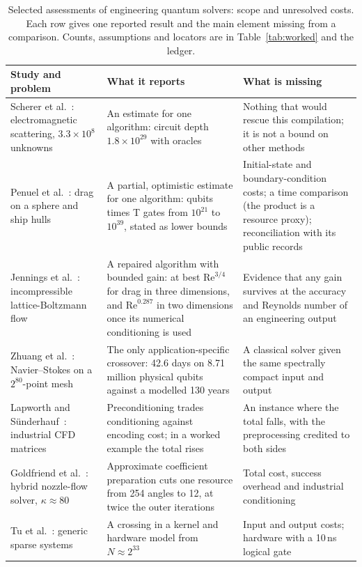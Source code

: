 \documentclass[10pt,a4paper]{article}
\begin{document}
\begin{table}[htbp]
\centering\small
\caption{Selected assessments of engineering quantum solvers: scope and unresolved costs. Each row gives one reported result and the main element missing from a comparison. Counts, assumptions and locators are in Table~\ref{tab:worked} and the ledger.}\label{tab:linstudies}
\begin{tabular}{@{}L{3.4cm} L{6.6cm} L{5.8cm}@{}}
\toprule
Study and problem & What it reports & What is missing\\\midrule
Scherer et al.~\cite{scherer2017}: electromagnetic scattering, $3.3\times10^8$ unknowns & An estimate for one algorithm: circuit depth $1.8\times10^{29}$ with oracles & Nothing that would rescue this compilation; it is not a bound on other methods\\
Penuel et al.~\cite{penuel2025}: drag on a sphere and ship hulls & A partial, optimistic estimate for one algorithm: qubits times T gates from $10^{21}$ to $10^{39}$, stated as lower bounds & Initial-state and boundary-condition costs; a time comparison (the product is a resource proxy); reconciliation with its public records\\
Jennings et al.~\cite{jennings2025}: incompressible lattice-Boltzmann flow & A repaired algorithm with bounded gain: at best $\mathrm{Re}^{3/4}$ for drag in three dimensions, and $\mathrm{Re}^{0.287}$ in two dimensions once its numerical conditioning is used & Evidence that any gain survives at the accuracy and Reynolds number of an engineering output\\
Zhuang et al.~\cite{zhuang2025}: Navier--Stokes on a $2^{80}$-point mesh & The only application-specific crossover: 42.6 days on 8.71 million physical qubits against a modelled 130 years & A classical solver given the same spectrally compact input and output\\
Lapworth and S\"underhauf~\cite{lapworth2025}: industrial CFD matrices & Preconditioning trades conditioning against encoding cost; in a worked example the total rises & An instance where the total falls, with the preprocessing credited to both sides\\
Goldfriend et al.~\cite{goldfriend2026}: hybrid nozzle-flow solver, $\kappa\approx80$ & Approximate coefficient preparation cuts one resource from 254 angles to 12, at twice the outer iterations & Total cost, success overhead and industrial conditioning\\
Tu et al.~\cite{tu2025}: generic sparse systems & A crossing in a kernel and hardware model from $N\approx2^{33}$ & Input and output costs; hardware with a 10\,ns logical gate\\
\bottomrule
\end{tabular}
\end{table}
\end{document}
